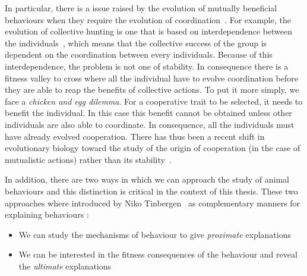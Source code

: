 
    In particular, there is a issue raised by the evolution of mutually beneficial behaviours when they require the evolution of coordination~\parencite{Alvard2001, Alvard2003, Drea2009, Leimar2003}. For example, the evolution of collective hunting is one that is based on interdependence between the individuals~\parencite{Tomasello2012}, which means that the collective success of the group is dependent on the coordination between every individuals. Because of this interdependence, the problem is not one of stability. In consequence there is a fitness valley to cross where all the individual have to evolve coordination before they are able to reap the benefits of collective actions. To put it more simply, we face a \emph{chicken and egg dilemma}. For a cooperative trait to be selected, it needs to benefit the individual. In this case this benefit cannot be obtained unless other individuals are also able to coordinate. In consequence, all the individuals must have already evolved cooperation. There has thus been a recent shift in evolutionary biology toward the study of the origin of cooperation (in the case of mutualistic actions) rather than its stability~\parencite{Forber2015}.


    In addition, there are two ways in which we can approach the study of animal behaviours and this distinction is critical in the context of this thesis. These two approaches where introduced by Niko Tinbergen~\parencite{Tinbergen1963, West2007a} as complementary manners for explaining behaviours :

    \begin{itemize}
      \item {We can study the mechanisms of behaviour to give \emph{proximate} explanations}
      \item {We can be interested in the fitness consequences of the behaviour and reveal the \emph{ultimate} explanations}
    \end{itemize}

